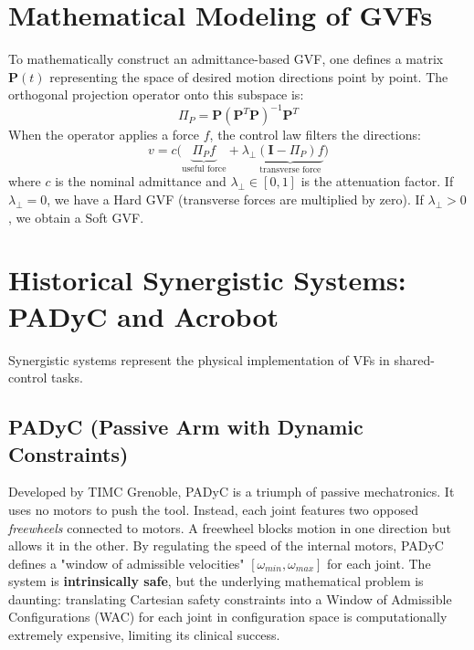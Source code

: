 \documentclass[11pt,a4paper,twoside]{report}
\begin{document}
\section{Mathematical Modeling of GVFs}
To mathematically construct an admittance-based GVF, one defines a matrix $\mathbf{P}(t)$ representing the space of desired motion directions point by point.
The orthogonal projection operator onto this subspace is:
\begin{equation}
    \Pi_P = \mathbf{P}(\mathbf{P}^T \mathbf{P})^{-1}\mathbf{P}^T
\end{equation}
When the operator applies a force $f$, the control law filters the directions:
\begin{equation}
    v = c \Big( \underbrace{\Pi_P f}_{\text{useful force}} + \lambda_\perp \underbrace{(\mathbf{I} - \Pi_P) f}_{\text{transverse force}} \Big)
\end{equation}
where $c$ is the nominal admittance and $\lambda_\perp \in [0, 1]$ is the attenuation factor.
If $\lambda_\perp = 0$, we have a Hard GVF (transverse forces are multiplied by zero). If $\lambda_\perp > 0$, we obtain a Soft GVF.

\section{Historical Synergistic Systems: PADyC and Acrobot}
Synergistic systems represent the physical implementation of VFs in shared-control tasks.

\subsection{PADyC (Passive Arm with Dynamic Constraints)}
Developed by TIMC Grenoble, PADyC is a triumph of passive mechatronics. It uses no motors to push the tool. Instead, each joint features two opposed \textit{freewheels} connected to motors. A freewheel blocks motion in one direction but allows it in the other. By regulating the speed of the internal motors, PADyC defines a "window of admissible velocities" $[\omega_{min}, \omega_{max}]$ for each joint.
The system is \textbf{intrinsically safe}, but the underlying mathematical problem is daunting: translating Cartesian safety constraints into a Window of Admissible Configurations (WAC) for each joint in configuration space is computationally extremely expensive, limiting its clinical success.
\end{document}
